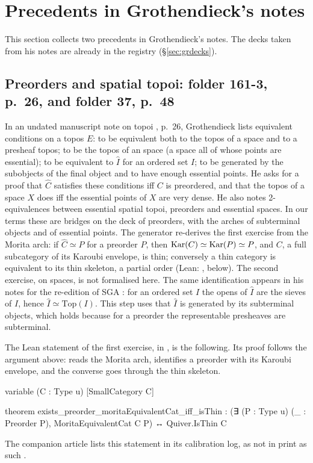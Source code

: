 \section{Precedents in Grothendieck's notes}\label{sec:precedents}

This section collects two precedents in Grothendieck's notes. The decks taken from his notes are already in the registry (\S\ref{sec:grdecks}).

\subsection{Preorders and spatial topoi: folder 161-3, p.~26, and folder 37, p.~48}

In an undated manuscript note on topoi \cite{grothendieck-161-3}, p.~26, Grothendieck lists equivalent conditions on a topos $E$: to be equivalent both to the topos of a space and to a presheaf topos; to be the topos of an  space (a space all of whose points are essential); to be equivalent to $\widehat I$ for an ordered set $I$; to be generated by the subobjects of the final object and to have enough essential points. He asks for a proof that $\widehat C$ satisfies these conditions iff $C$ is preordered, and that the topos of a space $X$ does iff the essential points of $X$ are very dense. He also notes 2-equivalences between essential spatial topoi, preorders and essential spaces. In our terms these are bridges on the deck of preorders, with the arches of subterminal objects and of essential points. The generator re-derives the first exercise from the Morita arch: if $\widehat C\simeq\widehat P$ for a preorder $P$, then $\operatorname{Kar}(C)\simeq\operatorname{Kar}(P)\simeq P$, and $C$, a full subcategory of its Karoubi envelope, is thin; conversely a thin category is equivalent to its thin skeleton, a partial order (Lean: , below). The second exercise, on spaces, is not formalised here. The same identification appears in his notes for the re-edition of SGA \cite[p.~48]{grothendieck-37}: for an ordered set $I$ the opens of $\widehat I$ are the sieves of $I$, hence $\widehat I\simeq\mathrm{Top}(I)$. This step uses that $\widehat I$ is generated by its subterminal objects, which holds because for a preorder the representable presheaves are subterminal.

The Lean statement of the first exercise, in , is the following. Its proof follows the argument above:  reads the Morita arch,  identifies a preorder with its Karoubi envelope, and the converse goes through the thin skeleton.
\begin{leancode}
variable (C : Type u) [SmallCategory C]

theorem exists_preorder_moritaEquivalentCat_iff_isThin :
    (∃ (P : Type u) (_ : Preorder P), MoritaEquivalentCat C P) ↔
      Quiver.IsThin C
\end{leancode}
The companion article lists this statement in its calibration log, as not in print as such \cite{bridges-generator}.

